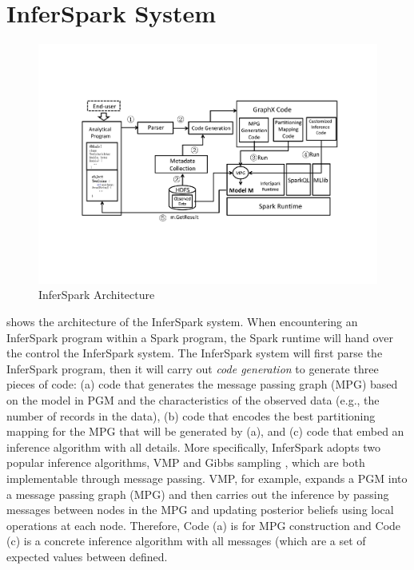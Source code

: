 
\section{InferSpark System}
\label{sec:optimization}

\begin{figure}[th]
\centering
    \includegraphics[width=1.4\columnwidth]{figs/InferFra1}
    \caption{InferSpark Architecture}
    \label{fig:workflow}
\end{figure}


 shows the architecture of the InferSpark system.
When encountering an InferSpark program within a Spark program,
the Spark runtime will hand over the control the InferSpark system.
The InferSpark system will
\protect {}
first parse the InferSpark program,
then it will \protect {} carry out \emph{code generation}
to generate three pieces of code:
(a) code that generates the message passing graph (MPG) based on the model in PGM and the characteristics of the observed data (e.g., the number of records in the data),
(b) code that encodes the best partitioning mapping for the MPG that will be generated by (a),
and (c) code that embed an inference algorithm with all details.
More specifically,
InferSpark adopts two popular inference algorithms,
VMP \cite{vmp} and Gibbs sampling \cite{gibbs},
which are both
implementable through message passing.
VMP, for example,  expands a PGM into a message passing graph (MPG)
and then carries out the inference
 by passing messages between nodes in the MPG
  and updating posterior beliefs using local operations at each node.
Therefore,
Code (a) is for MPG construction
and Code (c) is a concrete inference algorithm
with all messages (which are a set of expected values between  defined.


